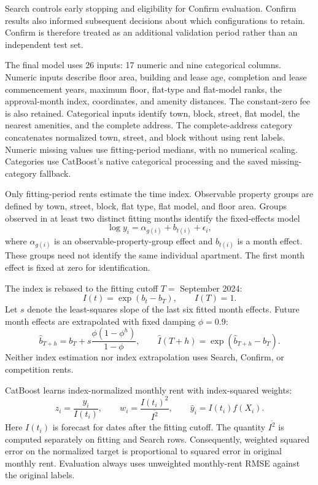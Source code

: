 \documentclass[10pt,a4paper]{article}
\begin{document}
Search controls early stopping and eligibility for Confirm evaluation.
Confirm results also informed subsequent decisions about which
configurations to retain.
Confirm is therefore treated as an additional validation period
rather than an independent test set.

The final model uses 26 inputs: 17 numeric and nine categorical
columns.
Numeric inputs describe floor area, building and lease age,
completion and lease commencement years, maximum floor,
flat-type and flat-model ranks, the approval-month index,
coordinates, and amenity distances.
The constant-zero fee is also retained.
Categorical inputs identify town, block, street, flat model,
the nearest amenities, and the complete address.
The complete-address category concatenates normalized town,
street, and block without using rent labels.
Numeric missing values use fitting-period medians, with no
numerical scaling.
Categories use CatBoost's native categorical processing and the
saved missing-category fallback.

Only fitting-period rents estimate the time index.
Observable property groups are defined by town, street, block,
flat type, flat model, and floor area.
Groups observed in at least two distinct fitting months identify
the fixed-effects model
\begin{equation}
\label{eq:model4-fixed-effects}
\log y_i
=
\alpha_{g(i)} + b_{t(i)} + \epsilon_i,
\end{equation}
where $\alpha_{g(i)}$ is an observable-property-group effect and
$b_{t(i)}$ is a month effect.
These groups need not identify the same individual apartment.
The first month effect is fixed at zero for identification.

The index is rebased to the fitting cutoff
$T=$ September 2024:
\[
I(t)=\exp(b_t-b_T),
\qquad I(T)=1.
\]
Let $s$ denote the least-squares slope of the last six fitted
month effects.
Future month effects are extrapolated with fixed damping
$\phi=0.9$:
\begin{equation}
\label{eq:model4-index}
\widehat b_{T+h}
=
b_T+s\frac{\phi(1-\phi^h)}{1-\phi},
\qquad
\widehat I(T+h)
=
\exp(\widehat b_{T+h}-b_T).
\end{equation}
Neither index estimation nor index extrapolation uses Search,
Confirm, or competition rents.

CatBoost learns index-normalized monthly rent with
index-squared weights:
\begin{equation}
\label{eq:model4-target}
z_i=\frac{y_i}{I(t_i)},
\qquad
w_i=\frac{I(t_i)^2}{\overline{I^2}},
\qquad
\widehat y_i=I(t_i)f(X_i).
\end{equation}
Here $I(t_i)$ is forecast for dates after the fitting cutoff.
The quantity $\overline{I^2}$ is computed separately on fitting
and Search rows.
Consequently, weighted squared error on the normalized target
is proportional to squared error in original monthly rent.
Evaluation always uses unweighted monthly-rent RMSE against
the original labels.
\end{document}
